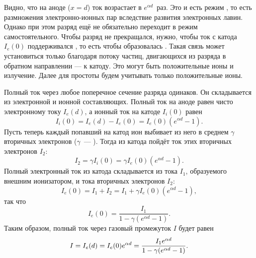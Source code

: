 Видно, что на аноде ($x=d$) ток возрастает в $e^{\alpha d}$~раз.
Это и есть режим , то есть размножения
электронно-ионных пар вследствие развития
электронных лавин. Однако при этом разряд ещё не обязательно переходит в режим
самостоятельного. Чтобы разряд не прекращался, нужно,
чтобы ток с катода $I_e(0)$ поддерживался ,
то есть чтобы образовалась .
Такая связь может установиться только благодаря потоку частиц, двигающихся
из разряда в обратном направлении --- к катоду. Это могут быть 
положительные ионы и излучение. 
Далее для простоты будем учитывать только положительные ионы.

Полный ток через любое поперечное сечение разряда одинаков.
Он складывается из электронной и ионной составляющих.
Полный ток на аноде равен чисто электронному току $I_e(d)$,
а ионный ток на катоде $I_i(0)$ равен
\begin{equation*}
	I_i(0)=I_e(d)-I_e(0)=I_e(0)(e^{\alpha d}-1).
\end{equation*}
Пусть теперь каждый попавший на катод ион выбивает из него в среднем
$\gamma$ вторичных электронов
($\gamma$~--- ).
Тогда из катода пойдёт ток этих вторичных электронов $I_2$:
\begin{equation*}
	I_2=\gamma I_i(0)=\gamma I_e(0)(e^{\alpha d}-1).
\end{equation*}
Полный электронный ток из катода складывается из тока $I_1$,
образуемого внешним ионизатором, и тока вторичных электронов $I_2$:
\begin{equation*}
	I_e(0)=I_1+I_2=I_1+\gamma I_e(0)(e^{\alpha d}-1),
\end{equation*}
так что
\begin{equation*}
	I_e(0)=\frac{I_1}{1-\gamma(e^{\alpha d}-1)}.
\end{equation*}
Таким образом, полный ток через газовый промежуток $I$ будет равен
\begin{equation}
    \eqmark{taunsendI}
	I=I_e(d)=I_e(0)e^{\alpha d}=\frac{I_1e^{\alpha d}}{1-\gamma(e^{\alpha
d}-1)}.
\end{equation}


